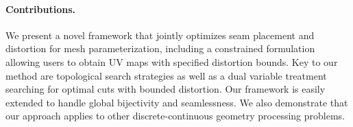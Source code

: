 \paragraph*{Contributions.} 
We present a novel framework that jointly optimizes seam placement and distortion for mesh parameterization,  including a constrained formulation allowing users to obtain UV maps with specified distortion bounds. Key to our method are topological search strategies as well as a dual variable treatment searching for optimal cuts with bounded distortion. Our framework is easily extended to handle global bijectivity and seamlessness.   We also demonstrate that our approach applies to other discrete-continuous geometry processing problems.%
